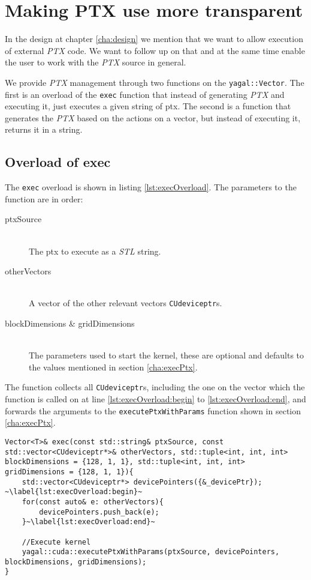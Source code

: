 \section{Making PTX use more transparent}
In the design at chapter \ref{cha:design} we mention that we want to allow execution of external \textit{PTX} code. We want to follow up on that and at the same time enable the user to work with the \textit{PTX} source in general. 

We provide \textit{PTX} management through two functions on the \texttt{yagal::Vector}. The first is an overload of the \texttt{exec} function that instead of generating \textit{PTX} and executing it, just executes a given string of ptx. The second is a function that generates the \textit{PTX} based on the actions on a vector, but instead of executing it, returns it in a string.

\subsection{Overload of exec}
The \texttt{exec} overload is shown in listing \ref{lst:execOverload}. The parameters to the function are in order:
\begin{description}
\item[ptxSource]\hfill\\The ptx to execute as a \textit{STL} string.
\item[otherVectors]\hfill\\A vector of the other relevant vectors \texttt{CUdeviceptr}s.
\item[blockDimensions \& gridDimensions]\hfill\\The parameters used to start the kernel, these are optional and defaults to the values mentioned in section \ref{cha:execPtx}.
\end{description}

The function collects all \texttt{CUdeviceptr}s, including the one on the vector which the function is called on at line \ref{lst:execOverload:begin} to \ref{lst:execOverload:end}, and forwards the arguments to the \texttt{executePtxWithParams} function shown in section \ref{cha:execPtx}.

\begin{lstlisting}[caption={\texttt{exec} overload to just execute \textit{PTX}.}, label={lst:execOverload}]
Vector<T>& exec(const std::string& ptxSource, const std::vector<CUdeviceptr*>& otherVectors, std::tuple<int, int, int> blockDimensions = {128, 1, 1}, std::tuple<int, int, int> gridDimensions = {128, 1, 1}){
    std::vector<CUdeviceptr*> devicePointers({&_devicePtr}); ~\label{lst:execOverload:begin}~
    for(const auto& e: otherVectors){
        devicePointers.push_back(e);
    }~\label{lst:execOverload:end}~

    //Execute kernel
    yagal::cuda::executePtxWithParams(ptxSource, devicePointers, blockDimensions, gridDimensions);
}
\end{lstlisting}

